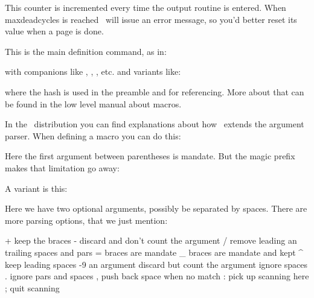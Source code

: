 \stopnewprimitive

\startoldprimitive[title={\prm {deadcycles}}]

This counter is incremented every time the output routine is entered. When \prm
{maxdeadcycles} is reached \TEX\ will issue an error message, so you'd better
reset its value when a page is done.

\stopoldprimitive

\startoldprimitive[title={\prm {def}}]

This is the main definition command, as in:

\starttyping
\def\foo{l me}
\stoptyping

with companions like , , , etc. and variants
like:

\starttyping
\def\foo#1{... #1...}
\stoptyping

where the hash is used in the preamble and for referencing. More about that can
be found in the low level manual about macros.

In the \CONTEXT\ distribution you can find explanations about how \LUAMETATEX\
extends the argument parser. When defining a macro you can do this:

\starttyping
\def\foo(#1)#2{...}
\stoptyping

Here the first argument between parentheses is mandate. But the magic
prefix \prm {tolerant} makes that limitation go away:

\starttyping
\tolerant{}
\stoptyping

A variant is this:

\starttyping
\tolerant{}
\stoptyping

Here we have two optional arguments, possibly be separated by spaces. There are
more parsing options, that we just mention:

\starttabulate[|T|i2l|]
\FL
\NC +   \NC keep the braces \NC \NR
\NC -   \NC discard and don't count the argument \NC \NR
\NC /   \NC remove leading an trailing spaces and pars \NC \NR
\NC =   \NC braces are mandate \NC \NR
\NC _   \NC braces are mandate and kept \NC \NR
\NC ^   \NC keep leading spaces \NC \NR
\ML
{}-9 \NC an argument \NC \NR
{}   \NC discard but count the argument \NC \NR
\ML
\NC *   \NC ignore spaces \NC \NR
\NC .   \NC ignore pars and spaces \NC \NR
\NC ,   \NC push back space when no match \NC \NR
\ML
\NC :   \NC pick up scanning here  \NC \NR
\NC ;   \NC quit scanning \NC \NR
\LL
\stoptabulate

\stopoldprimitive


